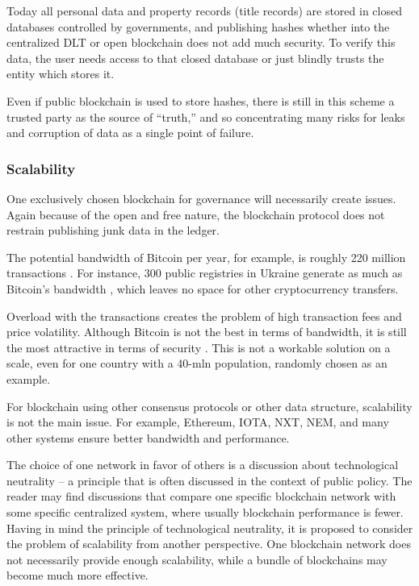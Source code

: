 \begin{multicols}{2}
Today all personal data and property records (title records) are stored in closed databases controlled by governments, and publishing hashes whether into the centralized DLT or open blockchain does not add much security. To verify this data, the user needs access to that closed database or just blindly trusts the entity which stores it.

Even if public blockchain is used to store hashes, there is still in this scheme a trusted party as the source of “truth,” and so concentrating many risks for leaks and corruption of data as a single point of failure.

\subsubsection{Scalability}

One exclusively chosen blockchain for governance will necessarily create issues. Again because of the open and free nature, the blockchain protocol does not restrain publishing junk data in the ledger.

The potential bandwidth of Bitcoin per year, for example, is roughly 220 million transactions \cite{art1-key17}. For instance, 300 public registries in Ukraine generate as much as Bitcoin’s bandwidth \cite{art1-key18}, which leaves no space for other cryptocurrency transfers.

Overload with the transactions creates the problem of high transaction fees and price volatility. Although Bitcoin is not the best in terms of bandwidth, it is still the most attractive in terms of security \cite{art1-key19}. This is not a workable solution on a scale, even for one country with a 40-mln population, randomly chosen as an example.

For blockchain using other consensus protocols or other data structure, scalability is not the main issue. For example, Ethereum, IOTA, NXT, NEM, and many other systems ensure better bandwidth and performance.

The choice of one network in favor of others is a discussion about technological neutrality – a principle that is often discussed in the context of public policy. The reader may find discussions that compare one specific blockchain network with some specific centralized system, where usually blockchain performance is fewer. Having in mind the principle of technological neutrality, it is proposed to consider the problem of scalability from another perspective. One blockchain network does not necessarily provide enough scalability, while a bundle of blockchains may become much more effective.


\end{multicols}
